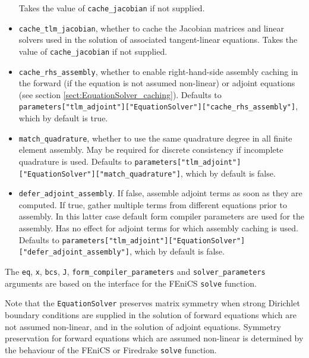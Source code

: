 \documentclass[11pt]{article}
\begin{document}
\begin{itemize}
    Takes the value of \texttt{cache\_jacobian} if not supplied.
  \item \texttt{cache\_tlm\_jacobian}, whether to cache the Jacobian matrices
    and linear solvers used in the solution of associated tangent-linear
    equations. Takes the value of \texttt{cache\_jacobian} if not supplied.
  \item \texttt{cache\_rhs\_assembly}, whether to enable right-hand-side
    assembly caching in the forward (if the equation is not assumed non-linear)
    or adjoint equations (see section \ref{sect:EquationSolver_caching}).
    Defaults to
    \texttt{parameters["tlm\_adjoint"]}\texttt{["EquationSolver"]}\texttt{["cache\_rhs\_assembly"]},
    which by default is true.
  \item \texttt{match\_quadrature}, whether to use the same quadrature degree
    in all finite element assembly. May be required for discrete consistency if
    incomplete quadrature is used. Defaults to
    \texttt{parameters["tlm\_adjoint"]}\texttt{["EquationSolver"]}\texttt{["match\_quadrature"]},
    which by default is false.
  \item \texttt{defer\_adjoint\_assembly}. If false, assemble adjoint terms as
    soon as they are computed. If true, gather multiple terms from different
    equations prior to assembly. In this latter case default form compiler
    parameters are used for the assembly. Has no effect for adjoint terms for
    which assembly caching is used. Defaults to
    \texttt{parameters["tlm\_adjoint"]}\texttt{["EquationSolver"]}\texttt{["defer\_adjoint\_assembly"]},
    which by default is false.
\end{itemize}
The \texttt{eq}, \texttt{x}, \texttt{bcs}, \texttt{J},
\texttt{form\_compiler\_parameters} and \texttt{solver\_parameters} arguments
are based on the interface for the FEniCS \texttt{solve} function.

Note that the \texttt{EquationSolver} preserves matrix symmetry when strong
Dirichlet boundary conditions are supplied in the solution of forward equations
which are not assumed non-linear, and in the solution of adjoint equations.
Symmetry preservation for forward equations which are assumed non-linear is
determined by the behaviour of the FEniCS or Firedrake \texttt{solve} function.
\end{document}
